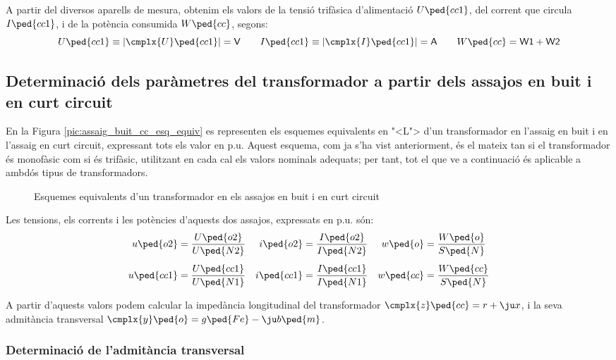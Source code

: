 A partir del diversos aparells de mesura, obtenim els valors de la
tensi\'{o} trif\`{a}sica d'alimentaci\'{o} $U\ped{cc1}$, del corrent que circula
$I\ped{cc1}$, i de la pot\`{e}ncia consumida $W\ped{cc}$, segons:
\begin{equation}
    U\ped{cc1}\equiv|\cmplx{U}\ped{cc1}|=\textsf{V} \qquad
    I\ped{cc1}\equiv|\cmplx{I}\ped{cc1}|=\textsf{A} \qquad
    W\ped{cc}=\textsf{W1}+\textsf{W2}
\end{equation}

\subsection{Determinaci\'{o} dels par\`{a}metres del transformador a partir dels assajos en buit i en curt circuit}

En la Figura \vref{pic:assaig_buit_cc_esq_equiv}  es representen els
esquemes equivalents en {"<}L{">} d'un transformador en l'assaig en buit i
en l'assaig en curt circuit, expressant tots els valor en p.u.
Aquest esquema, com ja s'ha vist anteriorment, \'{e}s el mateix tan si
el transformador \'{e}s monof\`{a}sic com si \'{e}s trif\`{a}sic, utilitzant en cada
cal els valors nominals adequats; per tant, tot el que ve a
continuaci\'{o} \'{e}s aplicable a ambd\'{o}s tipus de transformadors.

\begin{figure}[htb]
\centering
    
\caption{Esquemes equivalents d'un transformador en els assajos en
buit i en curt circuit} \label{pic:assaig_buit_cc_esq_equiv}
\end{figure}

Les tensions, els corrents i les pot\`{e}ncies d'aquests dos  assajos,
expressats en p.u. s\'{o}n:
\begin{align}
    u\ped{o2} &=\frac{U\ped{o2}}{U\ped{N2}} &
    i\ped{o2} &=\frac{I\ped{o2}}{I\ped{N2}} &
    w\ped{o}  &=\frac{W\ped{o}}{S\ped{N}} \\[1ex]
    u\ped{cc1} &=\frac{U\ped{cc1}}{U\ped{N1}} &
    i\ped{cc1} &=\frac{I\ped{cc1}}{I\ped{N1}} &
    w\ped{cc} &=\frac{W\ped{cc}}{S\ped{N}}
\end{align}

A partir d'aquests valors podem calcular la imped\`{a}ncia longitudinal
del transformador $\cmplx{z}\ped{cc}=r+\ju x$, i la seva admit\`{a}ncia
transversal $\cmplx{y}\ped{o}=g\ped{Fe}-\ju b\ped{m}$.

\subsubsection{Determinaci\'{o} de l'admit\`{a}ncia transversal}

